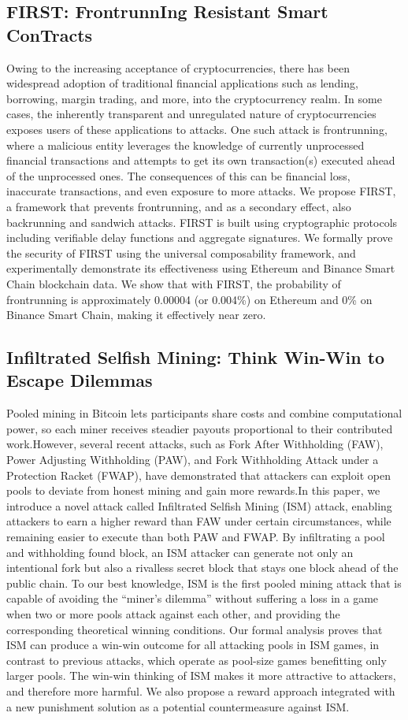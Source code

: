 \documentclass[11pt]{article}
\theoremstyle{definition}
\theoremstyle{remark}
\theoremstyle{plain}
\begin{document}
\subsection{\cite{10.1145/3708821.3736190} FIRST: FrontrunnIng Resistant Smart ConTracts}
Owing to the increasing acceptance of cryptocurrencies, there has been widespread adoption of traditional financial applications such as lending, borrowing, margin trading, and more, into the cryptocurrency realm. In some cases, the inherently transparent and unregulated nature of cryptocurrencies exposes users of these applications to attacks. One such attack is frontrunning, where a malicious entity leverages the knowledge of currently unprocessed financial transactions and attempts to get its own transaction(s) executed ahead of the unprocessed ones. The consequences of this can be financial loss, inaccurate transactions, and even exposure to more attacks. We propose FIRST, a framework that prevents frontrunning, and as a secondary effect, also backrunning and sandwich attacks. FIRST is built using cryptographic protocols including verifiable delay functions and aggregate signatures. We formally prove the security of FIRST using the universal composability framework, and experimentally demonstrate its effectiveness using Ethereum and Binance Smart Chain blockchain data. We show that with FIRST, the probability of frontrunning is approximately 0.00004 (or 0.004\%) on Ethereum and 0\% on Binance Smart Chain, making it effectively near zero.

\subsection{\cite{10.1145/3708821.3736191} Infiltrated Selfish Mining: Think Win-Win to Escape Dilemmas}
Pooled mining in Bitcoin lets participants share costs and combine computational power, so each miner receives steadier payouts proportional to their contributed work.However, several recent attacks, such as Fork After Withholding (FAW), Power Adjusting Withholding (PAW), and Fork Withholding Attack under a Protection Racket (FWAP), have demonstrated that attackers can exploit open pools to deviate from honest mining and gain more rewards.In this paper, we introduce a novel attack called Infiltrated Selfish Mining (ISM) attack, enabling attackers to earn a higher reward than FAW under certain circumstances, while remaining easier to execute than both PAW and FWAP. By infiltrating a pool and withholding found block, an ISM attacker can generate not only an intentional fork but also a rivalless secret block that stays one block ahead of the public chain. To our best knowledge, ISM is the first pooled mining attack that is capable of avoiding the “miner’s dilemma” without suffering a loss in a game when two or more pools attack against each other, and providing the corresponding theoretical winning conditions. Our formal analysis proves that ISM can produce a win-win outcome for all attacking pools in ISM games, in contrast to previous attacks, which operate as pool-size games benefitting only larger pools. The win-win thinking of ISM makes it more attractive to attackers, and therefore more harmful. We also propose a reward approach integrated with a new punishment solution as a potential countermeasure against ISM.
\end{document}
